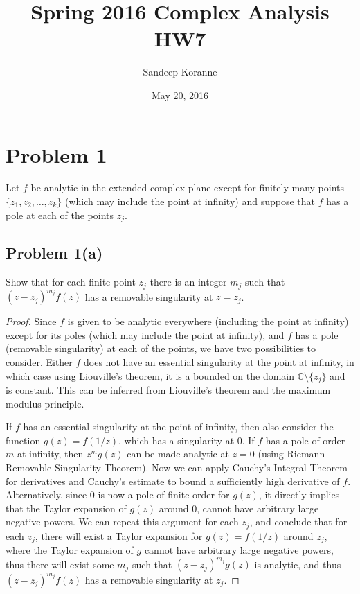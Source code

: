 \documentclass{article}[12pt]
\def\CC{{\mathbb C}}
\begin{document}
\title{Spring 2016 Complex Analysis HW7}
\author{Sandeep Koranne}
\date{May 20, 2016}
\maketitle


\section*{Problem 1}
Let $f$ be analytic in the extended complex plane except for
finitely many points $\{z_1,z_2,\ldots,z_k\}$ (which may include
the point at infinity) and suppose that $f$ has a pole at each of
the points $z_j$.
\subsection*{Problem 1(a)} Show that for each finite point $z_j$
there is an integer $m_j$ such that $(z-z_j)^{m_j}f(z)$ has a
removable singularity at $z=z_j$.
\begin{proof}
Since $f$ is given to be analytic everywhere (including the
point at infinity) except for its poles (which may include the
point at infinity), and $f$ has a pole (removable singularity)
at each of the points, we have two possibilities to consider.
Either $f$ does not have an essential singularity at the point
at infinity, in which case using Liouville's theorem, it is a
bounded on the domain $\CC\setminus \{z_j\}$ and is constant.
This can be inferred from Liouville's theorem and the maximum
modulus principle. 

If $f$ has an essential singularity at the point of infinity, then
also consider the function $g(z)=f(1/z)$, which has a singularity
at 0. If $f$ has a pole of order $m$ at infinity, then $z^mg(z)$
can be made analytic at $z=0$ (using Riemann Removable Singularity
Theorem). Now we can apply Cauchy's Integral Theorem for derivatives
and Cauchy's estimate to bound a sufficiently high derivative of $f$.
Alternatively, since 0 is now a pole of finite order for $g(z)$, it
directly implies that the Taylor expansion of $g(z)$ around 0, cannot
have arbitrary large negative powers. We can repeat this argument
for each $z_j$, and conclude that for each $z_j$, there will exist
a Taylor expansion for $g(z)=f(1/z)$ around $z_j$, where 
the Taylor expansion of $g$ cannot have arbitrary large negative
powers, thus there will exist some $m_j$ such that $(z-z_j)^{m_j}g(z)$
is analytic, and thus $(z-z_j)^{m_j}f(z)$ has a removable singularity
at $z_j$.
\end{proof}
\end{document}
